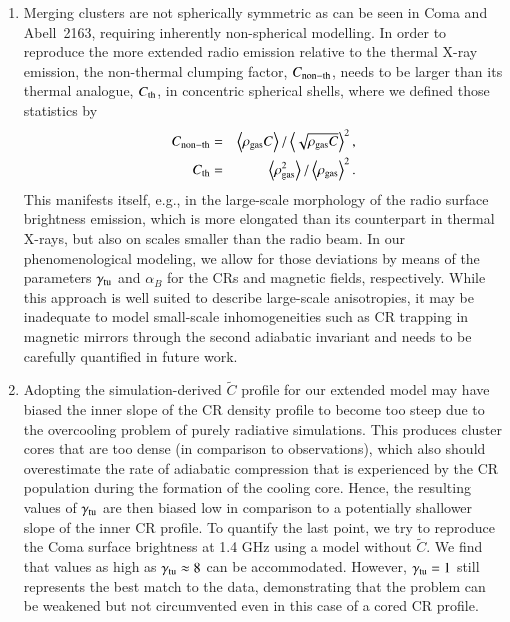 \documentclass[useAMS,usenatbib]{mn2e}
\newcommand{\expval}[1]{\left\langle #1 \right\rangle}
\begin{document}
\begin{enumerate} 
\item Merging clusters are not spherically symmetric as can be seen in Coma and
  Abell~2163, requiring inherently non-spherical modelling. In order to
  reproduce the more extended radio emission relative to the thermal X-ray
  emission, the non-thermal clumping factor, $C_{{\mathrm{non-th}}}$, needs to be
  larger than its thermal analogue, $C_{{\mathrm{th}}}$, in concentric spherical
  shells, where we defined those statistics by
  \begin{eqnarray}
    \label{eq:clumping}
    C_{\rmn{non-th}} &=&
    \expval{\rho_\rmn{gas} C}/\expval{\sqrt{\rho_\rmn{gas} C}}^2,\\
    C_{\rmn{th}} &=& 
    \expval{\rho_\rmn{gas}^2}/\expval{\rho_\rmn{gas}}^2.
  \end{eqnarray}
  This manifests itself, e.g., in the large-scale morphology of the radio
  surface brightness emission, which is more elongated than its counterpart in
  thermal X-rays, but also on scales smaller than the radio beam. In our
  phenomenological modeling, we allow for those deviations by means of the
  parameters $\gamma_{{\mathrm{tu}}}$ and $\alpha_B$ for the CRs and magnetic fields,
  respectively. While this approach is well suited to describe large-scale
  anisotropies, it may be inadequate to model small-scale inhomogeneities such
  as CR trapping in magnetic mirrors through the second adiabatic invariant and
  needs to be carefully quantified in future work.
\item Adopting the simulation-derived $\tilde{C}$ profile
  \citep{2010MNRAS.409..449P} for our extended model may have biased the inner
  slope of the CR density profile to become too steep due to the overcooling
  problem of purely radiative simulations. This produces cluster cores that are
  too dense (in comparison to observations), which also should overestimate the
  rate of adiabatic compression that is experienced by the CR population during
  the formation of the cooling core. Hence, the resulting values of
  $\gamma_{{\mathrm{tu}}}$ are then biased low in comparison to a potentially
  shallower slope of the inner CR profile. To quantify the last point, we try to
  reproduce the Coma surface brightness at 1.4 GHz using a model without
  $\tilde{C}$. We find that values as high as $\gamma_{{\mathrm{tu}}} \approx 8$ can
  be accommodated. However, $\gamma_{{\mathrm{tu}}}=1$ still represents the best
  match to the data, demonstrating that the problem can be weakened but not
  circumvented even in this case of a cored CR profile. 

\end{enumerate}
\end{document}
